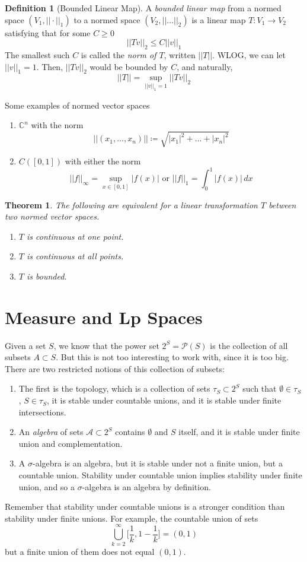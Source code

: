 \documentclass{article}
\newtheorem{theorem}{Theorem}[section]
\theoremstyle{remark}
\theoremstyle{definition}
\newtheorem{definition}{Definition}[section]
\begin{document}
\begin{definition}[Bounded Linear Map]
A \textit{bounded linear map} from a normed space $(V_1, ||\cdot||_1)$ to a normed space $(V_2, ||\ldots||_2)$ is a linear map $T: V_1 \longrightarrow V_2$ satisfying that for some $C \geq 0$
\[||T v||_2 \leq C ||v||_1\]
The smallest such $C$ is called the \textit{norm of $T$}, written $||T||$. WLOG, we can let $||v||_1 = 1$. Then, $||T v||_2$ would be bounded by $C$, and naturally, 
\[||T|| = \sup_{||v||_1 = 1} ||T v||_2\]
\end{definition}

Some examples of normed vector spaces
\begin{enumerate}
    \item $\mathbb{C}^n$ with the norm 
    \[||(x_1, \ldots, x_n)|| \coloneqq \sqrt{ |x_1|^2 + \ldots + |x_n|^2}\] 
    \item $C([0, 1])$ with either the norm 
    \[||f||_\infty = \sup_{x \in [0, 1]} |f(x)| \text{ or } ||f||_1 = \int_0^1 |f(x)|\,dx\]
\end{enumerate}

\begin{theorem}
The following are equivalent for a linear transformation $T$ between two normed vector spaces. 
\begin{enumerate}
    \item $T$ is continuous at one point. 
    \item $T$ is continuous at all points. 
    \item $T$ is bounded. 
\end{enumerate}
\end{theorem}

\section{Measure and Lp Spaces}
Given a set $S$, we know that the power set $2^S = \mathcal{P}(S)$ is the collection of all subsets $A \subset S$. But this is not too interesting to work with, since it is too big. There are two restricted notions of this collection of subsets: 
\begin{enumerate}
    \item The first is the topology, which is a collection of sets $\tau_S \subset 2^S$ such that $\emptyset \in \tau_S$, $S \in \tau_S$, it is stable under countable unions, and it is stable under finite intersections. 
    \item An \textit{algebra} of sets $\mathcal{A} \subset 2^S$ contains $\emptyset$ and $S$ itself, and it is stable under finite union and complementation. 
    \item A $\sigma$-algebra is an algebra, but it is stable under not a finite union, but a countable union. Stability under countable union implies stability under finite union, and so a $\sigma$-algebra is an algebra by definition. 
\end{enumerate}
Remember that stability under countable unions is a stronger condition than stability under finite unions. For example, the countable union of sets 
\[\bigcup_{k=2}^\infty \big[ \frac{1}{k} , 1 - \frac{1}{k} \big] = (0, 1)\]
but a finite union of them does not equal $(0, 1)$. 
\end{document}
